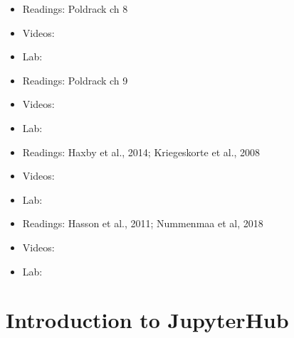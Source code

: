 \documentclass[letterpaper,10pt,english]{sphinxmanual}
\begin{document}
\begin{itemize}
\item {} 
Readings: Poldrack ch 8

\item {} 
Videos:

\item {} 
Lab:

\end{itemize}

\begin{itemize}
\item {} 
Readings: Poldrack ch 9

\item {} 
Videos:

\item {} 
Lab:

\end{itemize}

\begin{itemize}
\item {} 
Readings: Haxby et al., 2014; Kriegeskorte et al., 2008

\item {} 
Videos:

\item {} 
Lab:

\end{itemize}

\begin{itemize}
\item {} 
Readings: Hasson et al., 2011; Nummenmaa et al, 2018

\item {} 
Videos:

\item {} 
Lab:

\end{itemize}


\section{Introduction to JupyterHub}
\label{\detokenize{content/Introduction_to_JupyterHub:introduction-to-jupyterhub}}\label{\detokenize{content/Introduction_to_JupyterHub::doc}}
\end{document}
